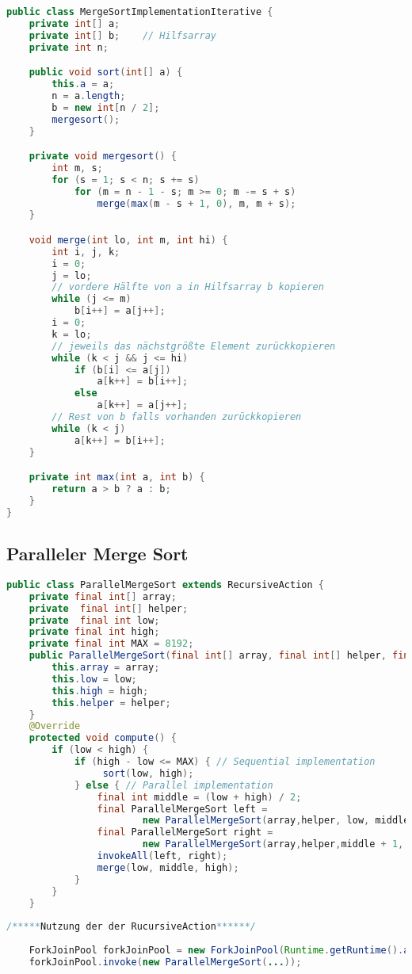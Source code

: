 \begin{lstlisting}[language=java,caption={iterativer Merge sort (Quelle: \cite{MergeSortIterativ})},label=lst:MergeSortIterativ]
public class MergeSortImplementationIterative {
    private int[] a;
    private int[] b;    // Hilfsarray
    private int n;

    public void sort(int[] a) {
        this.a = a;
        n = a.length;
        b = new int[n / 2];
        mergesort();
    }

    private void mergesort() {
        int m, s;
        for (s = 1; s < n; s += s)
            for (m = n - 1 - s; m >= 0; m -= s + s)
                merge(max(m - s + 1, 0), m, m + s);
    }

    void merge(int lo, int m, int hi) {
        int i, j, k;
        i = 0;
        j = lo;
        // vordere Hälfte von a in Hilfsarray b kopieren
        while (j <= m)
            b[i++] = a[j++];
        i = 0;
        k = lo;
        // jeweils das nächstgrößte Element zurückkopieren
        while (k < j && j <= hi)
            if (b[i] <= a[j])
                a[k++] = b[i++];
            else
                a[k++] = a[j++];
        // Rest von b falls vorhanden zurückkopieren
        while (k < j)
            a[k++] = b[i++];
    }

    private int max(int a, int b) {
        return a > b ? a : b;
    }
}
\end{lstlisting}
\subsection{Paralleler Merge Sort}

\begin{lstlisting}[language=java,caption={paralleler Merge sort (Quelle: \cite{MergeSortParallel})},label=lst:MergeSortParallel]
public class ParallelMergeSort extends RecursiveAction {
    private final int[] array;
    private  final int[] helper;
    private  final int low;
    private final int high;
    private final int MAX = 8192;
    public ParallelMergeSort(final int[] array, final int[] helper, final int low, final int high){
        this.array = array;
        this.low = low;
        this.high = high;
        this.helper = helper;
    }
    @Override
    protected void compute() {
        if (low < high) {
            if (high - low <= MAX) { // Sequential implementation
                 sort(low, high);
            } else { // Parallel implementation
                final int middle = (low + high) / 2;
                final ParallelMergeSort left =
                        new ParallelMergeSort(array,helper, low, middle);
                final ParallelMergeSort right =
                        new ParallelMergeSort(array,helper,middle + 1, high);
                invokeAll(left, right);
                merge(low, middle, high);
            }
        }
    } 
    
/*****Nutzung der der RucursiveAction******/
    
    ForkJoinPool forkJoinPool = new ForkJoinPool(Runtime.getRuntime().availableProcessors() - 1);
    forkJoinPool.invoke(new ParallelMergeSort(...));
\end{lstlisting}